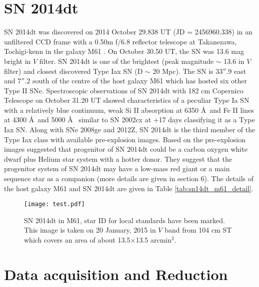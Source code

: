 \documentclass[fleqn,usenatbib]{mnras}
\begin{document}
\section{SN 2014dt}  
SN 2014dt was discovered on 2014 October 29.838 UT (JD = 2456960.338) in an unfiltered CCD frame with a 0.50m f/6.8 reflector telescope at Takanezawa, Tochigi-kenn in the galaxy M61 \citep{2014CBET.4011....1N}. On October 30.50 UT, the SN was 13.6 mag bright in $V$ filter. SN 2014dt is one of the brightest (peak magnitude $\sim$ 13.6 in $V$ filter) and closest discovered Type Iax SN (D $\sim$ 20 Mpc). The SN is 33$''$.9 east and 7$''$.2 south of the centre of the host galaxy M61 which has hosted six other Type II SNe. Spectroscopic observations of SN 2014dt with 182 cm Copernico Telescope on October 31.20 UT showed characteristics of a peculiar Type Ia SN with a relatively blue continuum, weak Si II absorption at 6350 \AA~and Fe II lines at 4300 \AA~and 5000 \AA~ \citep{2014CBET.4011....2O} similar to SN 2002cx at +17 days classifying it as a Type Iax SN. Along with SNe 2008ge and 2012Z, SN 2014dt is the third member of the Type Iax class with available pre-explosion images. Based on the pre-explosion images \cite{2015ApJ...798L..37F} suggested that progenitor of SN 2014dt could be a carbon oxygen white dwarf plus Helium star system with a hotter donor. They suggest that the progenitor system of SN 2014dt may have a low-mass red giant or a main sequence star as a companion (more details are given in section 6). The details of the host galaxy M61 and SN 2014dt are given in Table \ref{tab:sn14dt_m61_detail}. 


\begin{figure}
	\begin{center}
		\texttt{[image: test.pdf]}
	\end{center}
	\caption{SN 2014dt in M61, star ID for local standards have been marked. This image is taken on 20 January, 2015 in $V$ band from 104 cm ST which covers an area of about 13.5$\times$13.5 arcmin$^2$. }
	\label{fig:id_chart}
\end{figure} 
\section{Data acquisition and Reduction}
\end{document}
